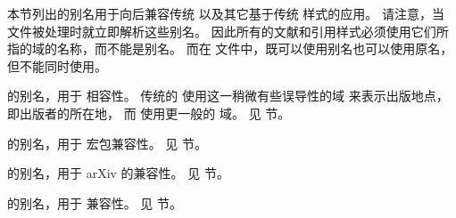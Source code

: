
本节列出的别名用于向后兼容传统 \BibTeX 以及其它基于传统 \BibTeX 样式的应用。
请注意，当  文件被处理时就立即解析这些别名。
因此所有的文献和引用样式必须使用它们所指的域的名称，而不能是别名。
而在  文件中，既可以使用别名也可以使用原名，但不能同时使用。


\begin{fieldlist}


  的别名，用于 \BibTeX 相容性。
传统的 \BibTeX 使用这一稍微有些误导性的域  来表示出版地点，即出版者的所在地，
而 \biblatex 使用更一般的  域。
见  节。




 的别名，用于  宏包兼容性。
见  节。




 的别名，用于 arXiv 的兼容性。
见  节。




 的别名，用于 \BibTeX 兼容性。
见  节。




\end{fieldlist}
